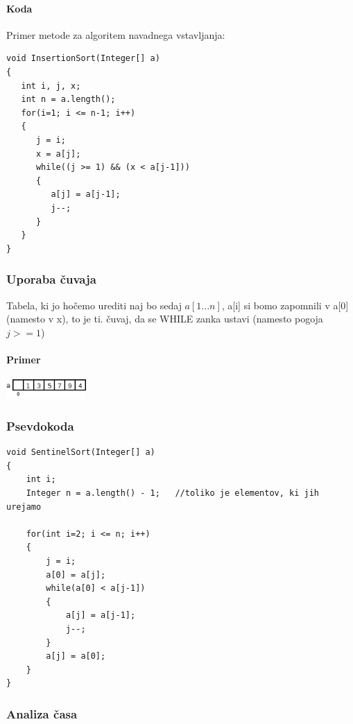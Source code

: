 \documentclass[a4paper,10pt]{article}
\begin{document}
\paragraph{Koda}
Primer metode za algoritem navadnega vstavljanja:\\
\begin{lstlisting}
void InsertionSort(Integer[] a)
{
   int i, j, x;
   int n = a.length();
   for(i=1; i <= n-1; i++)
   {
      j = i;
      x = a[j];
      while((j >= 1) && (x < a[j-1]))
      {
         a[j] = a[j-1];
         j--;
      }
   }
}
\end{lstlisting}

\subsubsection{Uporaba \v cuvaja}
Tabela, ki jo ho\v cemo urediti naj bo sedaj $a[1...n]$, a[i] si bomo zapomnili v a[0] (namesto v x), to je ti. \v cuvaj, da se WHILE zanka ustavi (namesto pogoja $j >= 1$)

\paragraph{Primer}
\begin{center}
	\includegraphics[width=3.05cm,height=0.75cm]{Slike/CuvajPrimer.png}
\end{center}

\subsubsection{Psevdokoda}

\begin{flushleft}
\begin{lstlisting}
void SentinelSort(Integer[] a)
{
    int i;
    Integer n = a.length() - 1;   //toliko je elementov, ki jih urejamo

    for(int i=2; i <= n; i++)
    {
        j = i;
        a[0] = a[j];
        while(a[0] < a[j-1])
        {
            a[j] = a[j-1];
            j--;
        }
        a[j] = a[0];
    }
}
\end{lstlisting}
\end{flushleft}

\subsubsection{Analiza \v casa}
\end{document}
